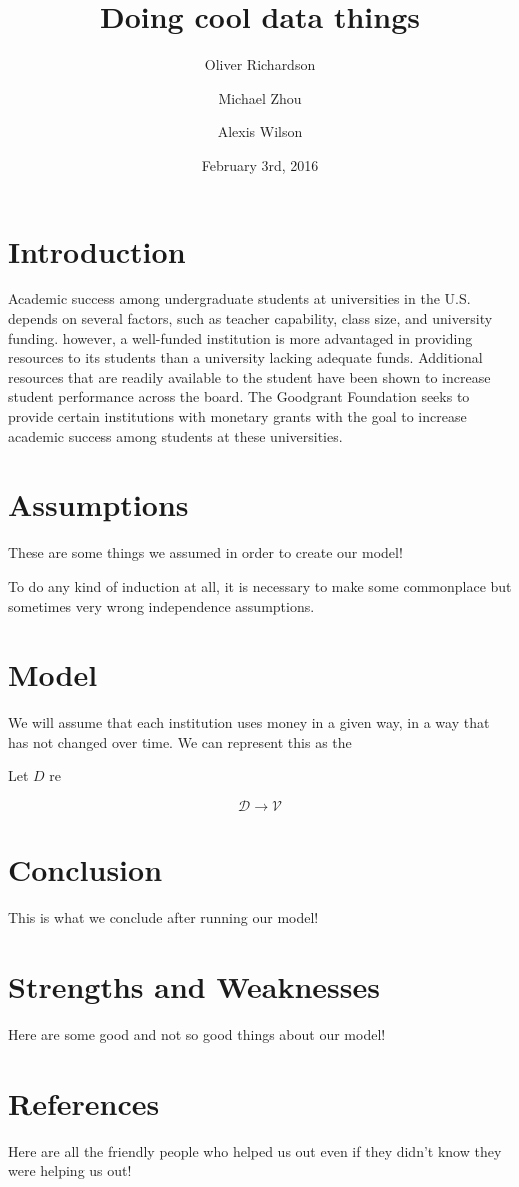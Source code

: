 \documentclass[paper.tex]{subfiles}
\title{Doing cool data things}
\author{Oliver Richardson}
\author{Michael Zhou}
\author{Alexis Wilson}
\date{February 3rd, 2016}
\newcommand{\D}{\mathcal{D}}
\newcommand{\V}{\mathcal{V}}
\begin{document}
	\maketitle
	
	
	\tableofcontents
	\pagebreak
	
	\section{Introduction}
	 Academic success among undergraduate students at universities in the U.S. depends on several factors, such as teacher capability, class size, and university funding. however, a well-funded institution is more advantaged in providing resources to its students than a university lacking adequate funds. Additional resources that are readily available to the student have been shown to increase student performance across the board.\cite{greenwald1996effect} The Goodgrant Foundation seeks to provide certain institutions with monetary grants with the goal to increase academic success among students at these universities. 
	
	
	\section{Assumptions}
	These are some things we assumed in order to create our model!
	
	To do any kind of induction at all, it is necessary to make some commonplace but sometimes very wrong independence assumptions. 
	\section{Model}
	We will assume that each institution uses money in a given way, in a way that has not changed over time. We can represent this as the 
	
	Let $D$ re
		
	\[ \D \to \V \]
	
	\section{Conclusion}
	This is what we conclude after running our model!
	
	\section{Strengths and Weaknesses}
	Here are some good and not so good things about our model!
	
	\section{References}
	Here are all the friendly people who helped us out even if they didn't know they were helping us out!
\end{document}
